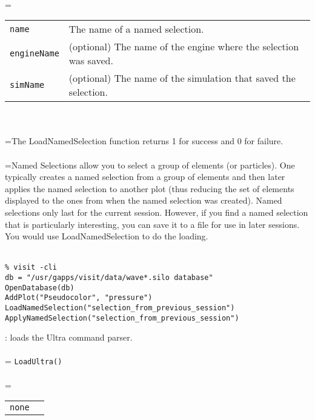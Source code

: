 \documentclass[10pt,a4paper]{report}
\begin{document}
 \\ 
\hangindent=\parindent 
\begin{tabular}{lp{9cm}}
\verb!name! & The name of a named selection. \\
\verb!engineName! & (optional) The name of the engine where the selection was saved. \\
\verb!simName! & (optional) The name of the simulation that saved the selection. \\
\end{tabular} \\[-2mm]


 \\ 
\hangindent=\parindent The LoadNamedSelection function returns 1 for success and 0 for failure. \\[-3mm] 

 \\ 
\hangindent=\parindent Named Selections allow you to select a group of elements (or particles). One typically creates a named selection from a group of elements and then later applies the named selection to another plot (thus reducing the set of elements displayed to the ones from when the named selection was created).  Named selections only last for the current session.  However,  if you find a named selection that is particularly interesting, you can  save it to a file for use in later sessions.  You would use  LoadNamedSelection to do the loading. \\[-3mm] 

\\[-6mm]
\begin{verbatim}% visit -cli
db = "/usr/gapps/visit/data/wave*.silo database"
OpenDatabase(db)
AddPlot("Pseudocolor", "pressure")
LoadNamedSelection("selection_from_previous_session")
ApplyNamedSelection("selection_from_previous_session")
\end{verbatim}
\newpage


{}
: loads the Ultra command parser.\\[-3mm]

 \\ 
\hangindent=\parindent 
\verb!LoadUltra()!\\ [-3mm]

 \\ 
\hangindent=\parindent 
\begin{tabular}{ll}
\verb!none! &  \\
\end{tabular} \\[-2mm]
\end{document}
